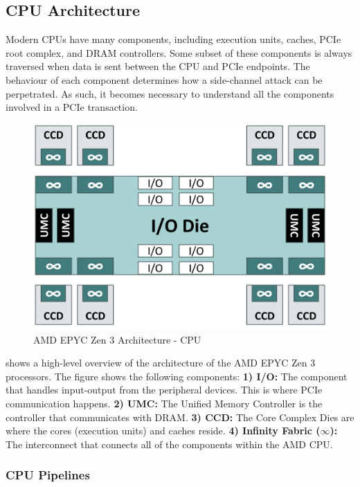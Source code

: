 \subsection{CPU Architecture}
\label{subsec:interconnect-sc-background-cpu-arch}

Modern CPUs have many components, including execution units, caches, PCIe root complex, and DRAM controllers.
Some subset of these components is always traversed when data is sent between the CPU and PCIe endpoints.
The behaviour of each component determines how a side-channel attack can be perpetrated.
As such, it becomes necessary to understand all the components involved in a PCIe transaction.

\begin{figure}[!htb]
    \centering
    \includegraphics[width=\columnwidth]{figures/interconnect-sc/amd_arch/processor.png}
    \caption{AMD EPYC Zen 3 Architecture - CPU}
    \label{fig:amd-cpu}
\end{figure}


 shows a high-level overview of the architecture of the AMD EPYC Zen 3 processors.
The figure shows the following components:
\textbf{1) I/O:} The component that handles input-output from the peripheral devices. This is where PCIe communication happens.
\textbf{2) UMC:} The Unified Memory Controller is the controller that communicates with DRAM.
\textbf{3) CCD:} The Core Complex Dies are where the cores (execution units) and caches reside.
\textbf{4) Infinity Fabric ($\infty$):} The interconnect that connects all of the components within the AMD CPU.

\subsubsection{CPU Pipelines}
\label{subsubsec:interconnect-sc-background-cpu-arch-pipelines}

